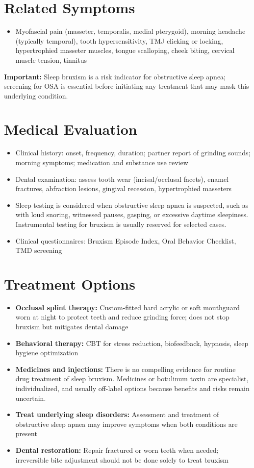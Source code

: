 \section*{Related Symptoms}
\begin{itemize}
 \item Myofascial pain (masseter, temporalis, medial pterygoid), morning headache (typically temporal), tooth hypersensitivity, TMJ clicking or locking, hypertrophied masseter muscles, tongue scalloping, cheek biting, cervical muscle tension, tinnitus
\end{itemize}
\textbf{Important:} Sleep bruxism is a risk indicator for obstructive sleep apnea; screening for OSA is essential before initiating any treatment that may mask this underlying condition.

\section*{Medical Evaluation}
\begin{itemize}
 \item Clinical history: onset, frequency, duration; partner report of grinding sounds; morning symptoms; medication and substance use review
 \item Dental examination: assess tooth wear (incisal/occlusal facets), enamel fractures, abfraction lesions, gingival recession, hypertrophied masseters
 \item Sleep testing is considered when obstructive sleep apnea is suspected, such as with loud snoring, witnessed pauses, gasping, or excessive daytime sleepiness. Instrumental testing for bruxism is usually reserved for selected cases.
 \item Clinical questionnaires: Bruxism Episode Index, Oral Behavior Checklist, TMD screening
\end{itemize}

\section*{Treatment Options}
\begin{itemize}
 \item \textbf{Occlusal splint therapy:} Custom-fitted hard acrylic or soft mouthguard worn at night to protect teeth and reduce grinding force; does not stop bruxism but mitigates dental damage
 \item \textbf{Behavioral therapy:} CBT for stress reduction, biofeedback, hypnosis, sleep hygiene optimization
 \item \textbf{Medicines and injections:} There is no compelling evidence for routine drug treatment of sleep bruxism. Medicines or botulinum toxin are specialist, individualized, and usually off-label options because benefits and risks remain uncertain.
 \item \textbf{Treat underlying sleep disorders:} Assessment and treatment of obstructive sleep apnea may improve symptoms when both conditions are present
 \item \textbf{Dental restoration:} Repair fractured or worn teeth when needed; irreversible bite adjustment should not be done solely to treat bruxism
\end{itemize}

